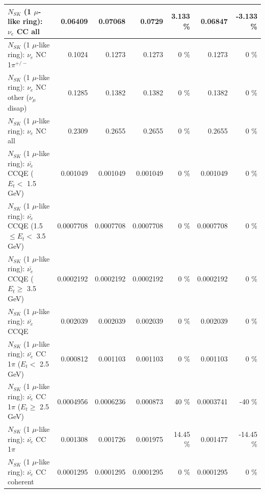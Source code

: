\begin{table}
\begin{tabular}{| l | r | r | r  r | r  r |}
                                  $N_{SK}$ (1 $\mu$-like ring): $\nu_{e}$ CC all &         0.06409 &         0.07068 &          0.0729 &    3.133 \%  &         0.06847 &   -3.133 \%  \\ 
\hline
                           $N_{SK}$ (1 $\mu$-like ring): $\nu_e$ NC 1$\pi^{+/-}$ &          0.1024 &          0.1273 &          0.1273 &        0 \%  &          0.1273 &        0 \%  \\ 
                $N_{SK}$ (1 $\mu$-like ring): $\nu_e$ NC other ($\nu_\mu$ disap) &          0.1285 &          0.1382 &          0.1382 &        0 \%  &          0.1382 &        0 \%  \\ 
                                  $N_{SK}$ (1 $\mu$-like ring): $\nu_{e}$ NC all &          0.2309 &          0.2655 &          0.2655 &        0 \%  &          0.2655 &        0 \%  \\ 
\hline
\hline
\hline
            $N_{SK}$ (1 $\mu$-like ring): $\bar{\nu_e}$ CCQE ($E_{t} <$ 1.5 GeV) &        0.001049 &        0.001049 &        0.001049 &        0 \%  &        0.001049 &        0 \%  \\ 
   $N_{SK}$ (1 $\mu$-like ring): $\bar{\nu_e}$ CCQE (1.5 $\leq E_{t} <$ 3.5 GeV) &       0.0007708 &       0.0007708 &       0.0007708 &        0 \%  &       0.0007708 &        0 \%  \\ 
         $N_{SK}$ (1 $\mu$-like ring): $\bar{\nu_e}$ CCQE ($E_{t} \geq$ 3.5 GeV) &       0.0002192 &       0.0002192 &       0.0002192 &        0 \%  &       0.0002192 &        0 \%  \\ 
\hline
                                $N_{SK}$ (1 $\mu$-like ring): $\bar{\nu_e}$ CCQE &        0.002039 &        0.002039 &        0.002039 &        0 \%  &        0.002039 &        0 \%  \\ 
\hline
       $N_{SK}$ (1 $\mu$-like ring): $\bar{\nu_e}$ CC 1$\pi$ ($E_{t} <$ 2.5 GeV) &        0.000812 &        0.001103 &        0.001103 &        0 \%  &        0.001103 &        0 \%  \\ 
    $N_{SK}$ (1 $\mu$-like ring): $\bar{\nu_e}$ CC 1$\pi$ ($E_{t} \geq$ 2.5 GeV) &       0.0004956 &       0.0006236 &        0.000873 &       40 \%  &       0.0003741 &      -40 \%  \\ 
\hline
                           $N_{SK}$ (1 $\mu$-like ring): $\bar{\nu_e}$ CC 1$\pi$ &        0.001308 &        0.001726 &        0.001975 &    14.45 \%  &        0.001477 &   -14.45 \%  \\ 
                         $N_{SK}$ (1 $\mu$-like ring): $\bar{\nu_e}$ CC coherent &       0.0001295 &       0.0001295 &       0.0001295 &        0 \%  &       0.0001295 &        0 \%  \\ 

\end{tabular}
\end{table}
